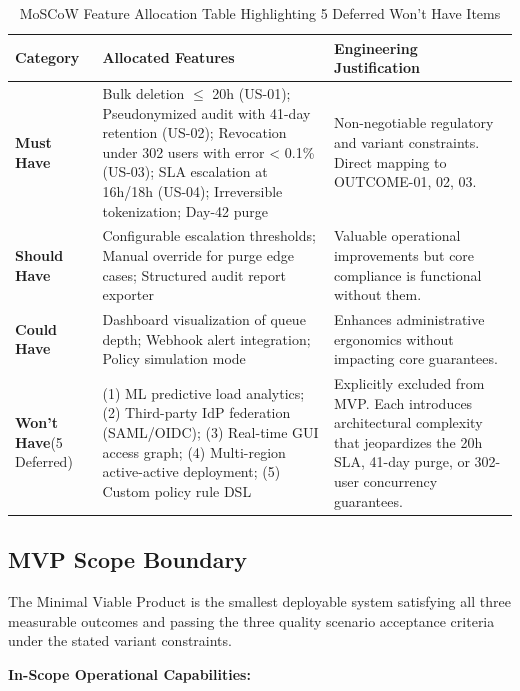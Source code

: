 \documentclass[10pt,a4paper]{article}
\begin{document}
\begin{table}[htbp]
\centering
\scriptsize
\begin{tabularx}{\textwidth}{|l|X|X|}
\hline
\textbf{Category} & \textbf{Allocated Features} & \textbf{Engineering Justification} \\
\hline
\textbf{Must Have} & Bulk deletion $\leq$ 20h (US-01); Pseudonymized audit with 41-day retention (US-02); Revocation under 302 users with error < 0.1\% (US-03); SLA escalation at 16h/18h (US-04); Irreversible tokenization; Day-42 purge & Non-negotiable regulatory and variant constraints. Direct mapping to OUTCOME-01, 02, 03. \\
\hline
\textbf{Should Have} & Configurable escalation thresholds; Manual override for purge edge cases; Structured audit report exporter & Valuable operational improvements but core compliance is functional without them. \\
\hline
\textbf{Could Have} & Dashboard visualization of queue depth; Webhook alert integration; Policy simulation mode & Enhances administrative ergonomics without impacting core guarantees. \\
\hline
\textbf{Won't Have}\newline(5 Deferred) & (1) ML predictive load analytics; (2) Third-party IdP federation (SAML/OIDC); (3) Real-time GUI access graph; (4) Multi-region active-active deployment; (5) Custom policy rule DSL & Explicitly excluded from MVP. Each introduces architectural complexity that jeopardizes the 20h SLA, 41-day purge, or 302-user concurrency guarantees. \\
\hline
\end{tabularx}
\caption{MoSCoW Feature Allocation Table Highlighting 5 Deferred Won't Have Items}
\label{tab:moscow}
\end{table}

\subsection{MVP Scope Boundary}

The Minimal Viable Product is the smallest deployable system satisfying all three measurable outcomes and passing the three quality scenario acceptance criteria under the stated variant constraints.

\textbf{In-Scope Operational Capabilities:}
\end{document}
